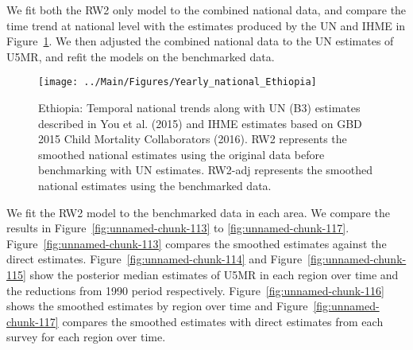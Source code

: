 \documentclass[12pt]{article}\usepackage[]{graphicx}\usepackage[]{color}
\newenvironment{knitrout}{}{} %
\begin{document}
We fit both the RW2 only model to the combined national data, and compare the time trend at national level with the estimates produced by the UN and IHME in Figure~\ref{fig:unnamed-chunk-112}. We then adjusted the combined national data to the UN estimates of U5MR, and refit the models on the benchmarked data. 

\begin{knitrout}
\color{fgcolor}\begin{figure}[bht]

{\centering \texttt{[image: ../Main/Figures/Yearly\_national\_Ethiopia]} 

}

\caption[Ethiopia]{Ethiopia: Temporal national trends along with UN (B3) estimates described in You et al. (2015) and IHME estimates based on GBD 2015 Child Mortality Collaborators (2016). RW2 represents the smoothed national estimates using the original data before benchmarking with UN estimates. RW2-adj represents the smoothed national estimates using the benchmarked data.}\label{fig:unnamed-chunk-112}
\end{figure}


\end{knitrout}
 

We fit the RW2 model to the benchmarked data in each area. 
We compare the results in Figure~\ref{fig:unnamed-chunk-113} to \ref{fig:unnamed-chunk-117}.
Figure~\ref{fig:unnamed-chunk-113} compares the smoothed estimates against the direct estimates. Figure~\ref{fig:unnamed-chunk-114} and Figure~\ref{fig:unnamed-chunk-115} show the posterior median estimates of U5MR in each region over time and the reductions from 1990 period respectively.
Figure~\ref{fig:unnamed-chunk-116} shows the smoothed estimates by region over time and Figure~\ref{fig:unnamed-chunk-117} compares the smoothed estimates with direct estimates from each survey for each region over time.




\end{document}
